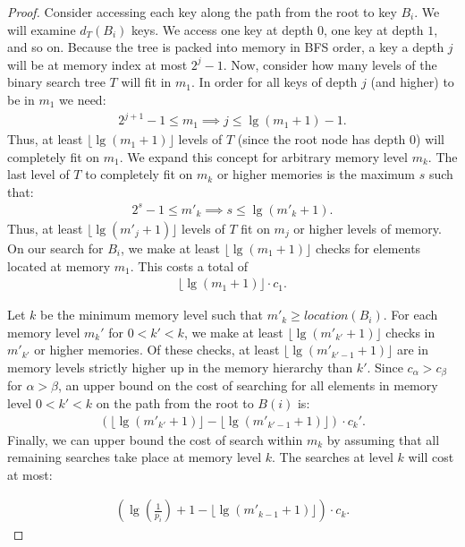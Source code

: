 \documentclass[letterpaper,12pt,titlepage,oneside,final]{book}
\theoremstyle{plain}
\begin{document}
\begin{proof}
Consider accessing each key along the path from the root to key $B_i$. We will examine $d_T(B_i)$ keys. We access one key at depth $0$, one key at depth $1$, and so on. Because the tree is packed into memory in BFS order, a key a depth $j$ will be at memory index at most $2^j-1$. Now, consider how many levels of the binary search tree $T$ will fit in $m_1$. In order for all keys of depth $j$ (and higher) to be in $m_1$ we need:
\begin{align*}
2^{j+1}-1 \leq m_1 \implies j \leq \lg(m_1 + 1)-1.
\end{align*}
Thus, at least $\lfloor \lg(m_1 + 1) \rfloor$ levels of $T$ (since the root node has depth $0$) will completely fit on $m_1$. We expand this concept for arbitrary memory level $m_k$. The last level of $T$ to completely fit on $m_k$ or higher memories is the maximum $s$ such that:
\begin{align*}
2^s-1 \leq m'_k \implies s \leq \lg(m'_k + 1).
\end{align*}
Thus, at least $\lfloor \lg(m'_j + 1) \rfloor$ levels of $T$ fit on $m_j$ or higher levels of memory.
On our search for $B_i$, we make at least $\lfloor \lg(m_1 + 1) \rfloor$ checks for elements located at memory $m_1$. This costs a total of
\begin{align*}
\lfloor \lg(m_1 + 1) \rfloor \cdot c_1.
\end{align*}

Let $k$ be the minimum memory level such that $m'_k \geq location(B_i)$. For each memory level $m_k'$ for $0 < k' < k$, we make at least $\lfloor \lg(m'_{k'} + 1) \rfloor$ checks in $m'_{k'}$ or higher memories. Of these checks, at least $\lfloor \lg(m'_{k'-1} + 1) \rfloor$ are in memory levels strictly higher up in the memory hierarchy than $k'$. Since $c_\alpha > c_\beta$ for $\alpha > \beta$, an upper bound on the cost of searching for all elements in memory level $0 < k' < k$ on the path from the root to $B(i)$ is:
\begin{align*}
(\lfloor \lg(m'_{k'} + 1) \rfloor - \lfloor \lg(m'_{k'-1} + 1) \rfloor) \cdot c_k'.
\end{align*}
Finally, we can upper bound the cost of search within $m_k$ by assuming that all remaining searches take place at memory level $k$. The searches at level $k$ will cost at most:

\begin{align*}
(\lg(\frac{1}{p_i}) + 1 - \lfloor \lg(m'_{k-1}+1) \rfloor)\cdot c_k.
\end{align*}


\end{proof}
\end{document}
